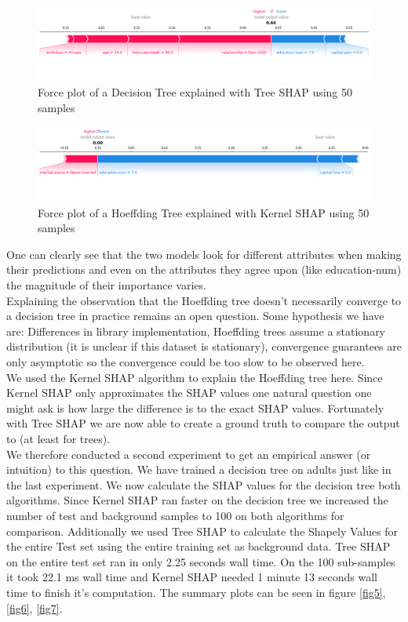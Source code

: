 \documentclass[conference]{IEEEtran}
\begin{document}
\begin{figure}[htbp]
\centerline{
	\includegraphics[width=\linewidth]{../fig/ex_01_TreeShap_DecisionTree_50_Samples_ForcePlot_sample_1.png}
}
\caption{Force plot of a Decision Tree explained with Tree SHAP using 50 samples}
\label{fig3}
\end{figure}

\begin{figure}[htbp]
\centerline{
	\includegraphics[width=\linewidth]{../fig/ex_01_KernelShap_HoeffdingTree_50_Samples_ForcePlot_sample_1.png}
}
\caption{Force plot of a Hoeffding Tree explained with Kernel SHAP using 50 samples}
\label{fig4}
\end{figure}

One can clearly see that the two models look for different attributes when making their predictions and even on the attributes they agree upon (like education-num) the magnitude of their importance varies.\\
Explaining the observation that the Hoeffding tree doesn't necessarily converge to a decision tree in practice remains an open question.
Some hypothesis we have are: Differences in library implementation, Hoeffding trees assume a stationary distribution (it is unclear if this dataset is stationary), convergence guarantees are only asymptotic so the convergence could be too slow to be observed here.\\

We used the Kernel SHAP algorithm to explain the Hoeffding tree here. Since Kernel SHAP only approximates the SHAP values one natural question one might ask is how large the difference is to the exact SHAP values.
Fortunately with Tree SHAP we are now able to create a ground truth to compare the output to (at least for trees).\\
We therefore conducted a second experiment to get an empirical answer (or intuition) to this question.
We have trained a decision tree on adults just like in the last experiment. 
We now calculate the SHAP values for the decision tree both algorithms. 
Since Kernel SHAP ran faster on the decision tree we increased the number of test and background samples to 100 on both algorithms for comparison.
Additionally we used Tree SHAP to calculate the Shapely Values for the entire Test set using the entire training set as background data.
Tree SHAP on the entire test set ran in only 2.25 seconds wall time. On the 100 sub-samples it took 22.1 ms wall time and Kernel SHAP needed 1 minute 13 seconds wall time to finish it's computation.
The summary plots can be seen in figure \ref{fig5}, \ref{fig6}, \ref{fig7}.
\end{document}
